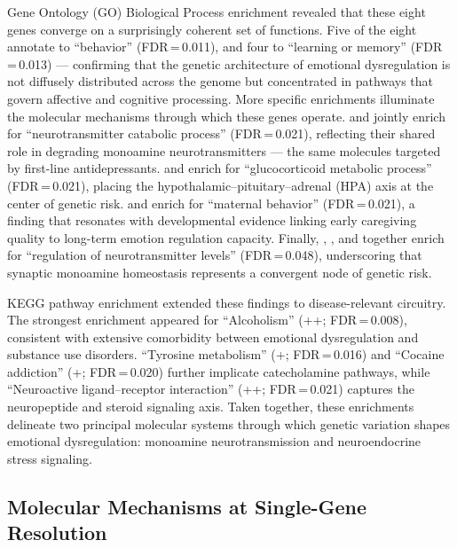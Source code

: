 Gene Ontology (GO) Biological Process enrichment revealed that these eight
genes converge on a surprisingly coherent set of functions.
Five of the eight annotate to ``behavior'' (FDR\,=\,0.011), and four to
``learning or memory'' (FDR\,=\,0.013) — confirming that the genetic
architecture of emotional dysregulation is not diffusely distributed across the
genome but concentrated in pathways that govern affective and cognitive
processing.\cite{szklarczyk2023,ashburner2000}
More specific enrichments illuminate the molecular mechanisms through which
these genes operate.
 and  jointly enrich for ``neurotransmitter catabolic
process'' (FDR\,=\,0.021), reflecting their shared role in degrading
monoamine neurotransmitters — the same molecules targeted by first-line
antidepressants.
 and  enrich for ``glucocorticoid metabolic process''
(FDR\,=\,0.021), placing the hypothalamic--pituitary--adrenal (HPA) axis at
the center of genetic risk.
 and  enrich for ``maternal behavior''
(FDR\,=\,0.021), a finding that resonates with developmental evidence linking
early caregiving quality to long-term emotion regulation capacity.\cite{vantieghem2018}
Finally, , , and  together enrich for
``regulation of neurotransmitter levels'' (FDR\,=\,0.048), underscoring that
synaptic monoamine homeostasis represents a convergent node of genetic risk.

KEGG pathway enrichment extended these findings to disease-relevant circuitry.
The strongest enrichment appeared for ``Alcoholism''
(++; FDR\,=\,0.008), consistent with
extensive comorbidity between emotional dysregulation and substance use
disorders.\cite{brand2019}
``Tyrosine metabolism'' (+; FDR\,=\,0.016) and
``Cocaine addiction'' (+; FDR\,=\,0.020) further
implicate catecholamine pathways, while ``Neuroactive ligand--receptor
interaction'' (++; FDR\,=\,0.021) captures
the neuropeptide and steroid signaling axis.
Taken together, these enrichments delineate two principal molecular systems
through which genetic variation shapes emotional dysregulation: monoamine
neurotransmission and neuroendocrine stress signaling.

\subsection*{Molecular Mechanisms at Single-Gene Resolution}

